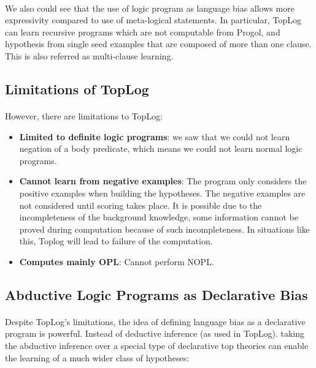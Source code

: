 \documentclass{article}
\theoremstyle{plain}
\theoremstyle{definition}
\begin{document}
\begin{multicols}{2}
\paragraph{} We also could see that the use of logic program as language bias allows more expressivity compared to use of meta-logical statements. In particular, TopLog can learn recursive programs which are not computable from Progol, and hypothesis from single seed examples that are composed of more than one clause. This is also referred as multi-clause learning. 

\subsection{Limitations of TopLog}

\paragraph{} However, there are limitations to TopLog:

\begin{itemize}
\item \textbf{Limited to definite logic programs}: we saw that we could not learn negation of a body predicate, which means we could not learn normal logic programs. 
\item \textbf{Cannot learn from negative examples}: The program only considers the positive examples when building the hypotheses. The negative examples are not considered until scoring takes place. It is possible due to the incompleteness of the background knowledge, some information cannot be proved during computation because of such incompleteness. In situations like this, Toplog will lead to failure of the computation. 
\item \textbf{Computes mainly OPL}: Cannot perform NOPL.
\end{itemize}

\subsection{Abductive Logic Programs as Declarative Bias}

\paragraph{} Despite TopLog's limitations, the idea of defining language bias as a declarative program is powerful. Instead of deductive inference (as used in TopLog). taking the abductive inference over a special type of declarative top theories can enable the learning of a much wider class of hypotheses:


\end{multicols}
\end{document}
